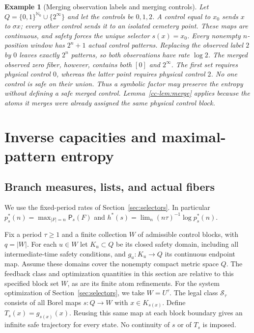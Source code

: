 \documentclass[11pt,reqno]{amsart}
\numberwithin{equation}{section}
\newtheorem{example}[theorem]{Example}
\theoremstyle{definition}
\newcommand{\Nzero}{\mathbb N_0}
\newcommand{\Patt}{\mathsf P}
\begin{document}
\begin{example}[Merging observation labels and merging controls]
\label{ex:physical-merge}
Let $Q=\{0,1\}^{\Nzero}\cup\{2^\infty\}$ and let the controls
be $0,1,2$. A control equal to $x_0$ sends $x$ to $\sigma x$;
every other control sends it to an isolated cemetery point.
These maps are continuous, and safety forces the unique selector
$s(x)=x_0$. Every nonempty $n$-position window has $2^n+1$ actual control
patterns. Replacing the observed label $2$ by $0$ leaves exactly
$2^n$ patterns, so both observations have rate $\log2$.
The merged observed zero fiber, however, contains both $[0]$ and
$2^\infty$. The first set requires physical control $0$, whereas
the latter point requires physical control $2$. No one control is
safe on their union. Thus a symbolic factor may preserve the entropy
without defining a safe merged control. Lemma~\ref{cc-lem:merge}
applies because the atoms it merges were already assigned the
\emph{same} physical control block.
\end{example}


\section{Inverse capacities and maximal-pattern entropy}\label{sec:capacity}

\subsection{Branch measures, lists, and actual fibers}
We use the fixed-period rates of Section~\ref{sec:selectors}.
In particular $p_s^*(n)=\max_{|F|=n}\Patt_s(F)$ and
$h^*(s)=\lim_n(n\tau)^{-1}\log p_s^*(n)$.

Fix a period $\tau\ge1$ and a finite collection $W$ of admissible
control blocks, with $q=|W|$. For each $u\in W$ let $K_u\subset Q$
be its closed safety domain, including all intermediate-time safety
conditions, and $g_u:K_u\to Q$ its continuous endpoint map.
Assume these domains cover the nonempty compact metric space $Q$.
The feedback class and optimization quantities in this section are
relative to this specified block set $W$, as are its finite atom
refinements. For the system optimization of Section~\ref{sec:selectors},
we take $W=U^\tau$.
The legal class $\mathcal S_\tau$ consists of all Borel maps
$s:Q\to W$ with $x\in K_{s(x)}$. Define
$T_s(x)=g_{s(x)}(x)$. Reusing this same map at each block boundary
gives an infinite safe trajectory for every state. No continuity of
$s$ or of $T_s$ is imposed.
\end{document}

